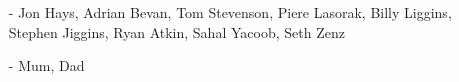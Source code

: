 \clearpage


\begin{acknowledgements}
\begin{itemize}
\item[-] Jon Hays, Adrian Bevan, Tom Stevenson, Piere Lasorak, Billy Liggins,
  Stephen Jiggins, Ryan Atkin, Sahal Yacoob, Seth Zenz
\item[-] Mum, Dad
\end{itemize}
\end{acknowledgements}

\clearpage